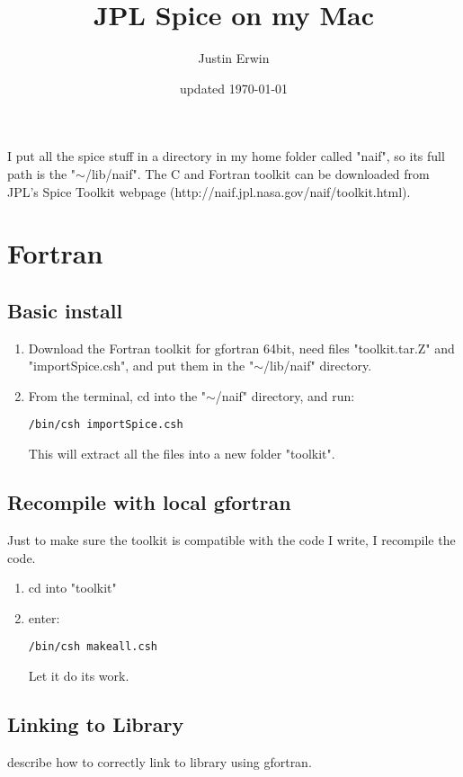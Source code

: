 \documentclass[11pt]{article}
\begin{document}
\title{JPL Spice on my Mac}
\author{Justin Erwin}
\date{updated \today}
\maketitle

I put all the spice stuff in a directory in my home folder called "naif", so its full path is the "$\sim$/lib/naif". The C and Fortran toolkit can be downloaded from JPL's Spice Toolkit webpage (http://naif.jpl.nasa.gov/naif/toolkit.html).



\section{Fortran}

\subsection{Basic install}
\begin{enumerate}
	\item Download the Fortran toolkit for gfortran 64bit, need files "toolkit.tar.Z" and "importSpice.csh", and put them in the "$\sim$/lib/naif" directory.
	\item From the terminal, cd into the "$\sim$/naif" directory, and run: 
\begin{lstlisting}[style=Bash]
/bin/csh importSpice.csh
\end{lstlisting}
	This will extract all the files into a new folder "toolkit".
\end{enumerate}

\subsection{Recompile with local gfortran}
Just to make sure the toolkit is compatible with the code I write, I recompile the code.
\begin{enumerate}
	\item cd into "toolkit"
	\item enter:
\begin{lstlisting}[style=Bash]
/bin/csh makeall.csh
\end{lstlisting} 
	Let it do its work.
\end{enumerate}

\subsection{Linking to Library}
describe how to correctly link to library using gfortran.
\end{document}

